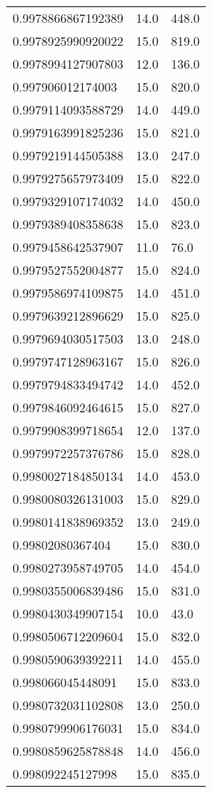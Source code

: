 \begin{center}
\begin{supertabular}[H]{p{0.30\textwidth}p{0.05\textwidth}p{0.05\textwidth}}
0.9978866867192389 & 14.0 & 448.0 \\ 
0.9978925990920022 & 15.0 & 819.0 \\ 
0.9978994127907803 & 12.0 & 136.0 \\ 
0.997906012174003 & 15.0 & 820.0 \\ 
0.9979114093588729 & 14.0 & 449.0 \\ 
0.9979163991825236 & 15.0 & 821.0 \\ 
0.9979219144505388 & 13.0 & 247.0 \\ 
0.9979275657973409 & 15.0 & 822.0 \\ 
0.9979329107174032 & 14.0 & 450.0 \\ 
0.9979389408358638 & 15.0 & 823.0 \\ 
0.9979458642537907 & 11.0 & 76.0 \\ 
0.9979527552004877 & 15.0 & 824.0 \\ 
0.9979586974109875 & 14.0 & 451.0 \\ 
0.9979639212896629 & 15.0 & 825.0 \\ 
0.9979694030517503 & 13.0 & 248.0 \\ 
0.9979747128963167 & 15.0 & 826.0 \\ 
0.9979794833494742 & 14.0 & 452.0 \\ 
0.9979846092464615 & 15.0 & 827.0 \\ 
0.9979908399718654 & 12.0 & 137.0 \\ 
0.9979972257376786 & 15.0 & 828.0 \\ 
0.9980027184850134 & 14.0 & 453.0 \\ 
0.9980080326131003 & 15.0 & 829.0 \\ 
0.9980141838969352 & 13.0 & 249.0 \\ 
0.99802080367404 & 15.0 & 830.0 \\ 
0.9980273958749705 & 14.0 & 454.0 \\ 
0.9980355006839486 & 15.0 & 831.0 \\ 
0.9980430349907154 & 10.0 & 43.0 \\ 
0.9980506712209604 & 15.0 & 832.0 \\ 
0.9980590639392211 & 14.0 & 455.0 \\ 
0.998066045448091 & 15.0 & 833.0 \\ 
0.9980732031102808 & 13.0 & 250.0 \\ 
0.9980799906176031 & 15.0 & 834.0 \\ 
0.9980859625878848 & 14.0 & 456.0 \\ 
0.998092245127998 & 15.0 & 835.0 \\ 

\end{supertabular}
\end{center}
